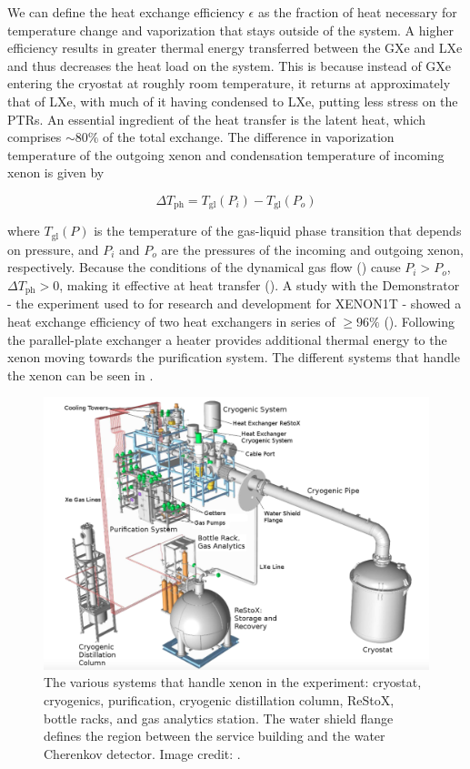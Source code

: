We can define the heat exchange
efficiency $\epsilon$ as the fraction of heat necessary for temperature change and vaporization that stays outside of the system.  A higher
efficiency results in greater thermal energy transferred between the GXe and LXe and thus decreases the heat load on the system.  This is
because instead of GXe entering the cryostat at roughly
room temperature, it returns at approximately that of LXe, with much of it having condensed to LXe, putting less stress on the
PTRs.  An essential ingredient of the heat transfer is the latent heat, which comprises ${\sim} 80\%$ of the total exchange.  The
difference in vaporization temperature of the outgoing xenon and condensation temperature of incoming xenon is given by

\begin{equation}
\Delta T_{\mathrm{ph}} = T_{\mathrm{gl}} (P_i) - T_{\mathrm{gl}} (P_o)
\label{eq:xenon1t_cryo_latent}
\end{equation}

where $T_{\mathrm{gl}} (P)$ is the temperature of the gas-liquid phase transition that depends on pressure, and $P_i$ and $P_o$ are the
pressures of the incoming and outgoing xenon, respectively.  Because the conditions of the dynamical gas flow
() cause $P_i > P_o$, $\Delta T_{\mathrm{ph}} > 0$, making it effective at heat transfer
().  A study with the Demonstrator - the
experiment used to for research and development for XENON1T - showed a heat exchange efficiency of
two heat exchangers in series of $\geq 96\%$ ().  Following the parallel-plate exchanger a heater provides additional
thermal energy to the xenon moving towards the purification system.  The different systems that handle the xenon can be seen in
.

\begin{figure}
\centering
\includegraphics[width=\textwidth]{CryoOverview}
\caption{The various systems that handle xenon in the experiment: cryostat, cryogenics, purification, cryogenic distillation column,
ReStoX, bottle racks, and gas analytics station.  The water shield flange defines the region between the service building and the water
Cherenkov detector.  Image credit: .}
\label{fig:xenon1t_cryo_overview}
\end{figure}



